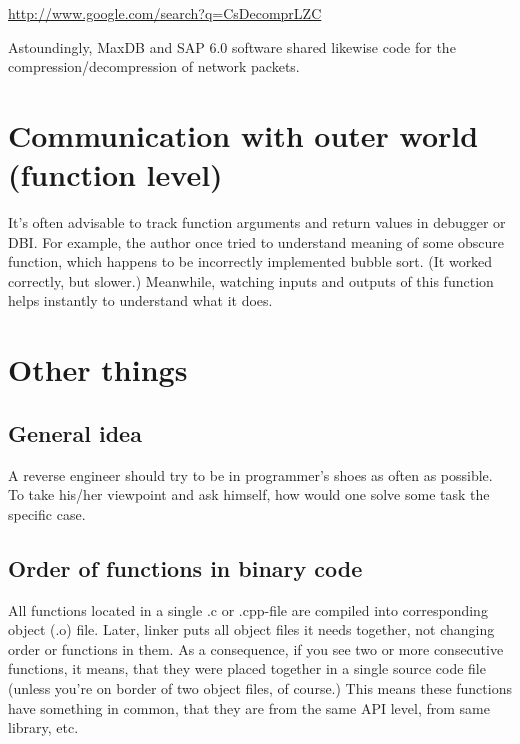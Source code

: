 \url{http://www.google.com/search?q=CsDecomprLZC}

Astoundingly, MaxDB and SAP 6.0 software shared likewise code for the compression/decompression of network packets.




\section{Communication with outer world (function level)}
It's often advisable to track function arguments and return values in debugger or \ac{DBI}.
For example, the author once tried to understand meaning of some obscure function, which happens to be incorrectly
implemented bubble sort.
(It worked correctly, but slower.)
Meanwhile, watching inputs and outputs of this function helps instantly to understand what it does.%













\section{Other things}

\subsection{General idea}

A reverse engineer should try to be in programmer's shoes as often as possible. 
To take his/her viewpoint and ask himself, how would one solve some task the specific case.

\subsection{Order of functions in binary code}

All functions located in a single .c or .cpp-file are compiled into corresponding object (.o) file.
Later, linker puts all object files it needs together, not changing order or functions in them.
As a consequence, if you see two or more consecutive functions, it means, that they were placed together
in a single source code file (unless you're on border of two object files, of course.)
This means these functions have something in common, that they are from the same \ac{API} level, from same library, etc.

